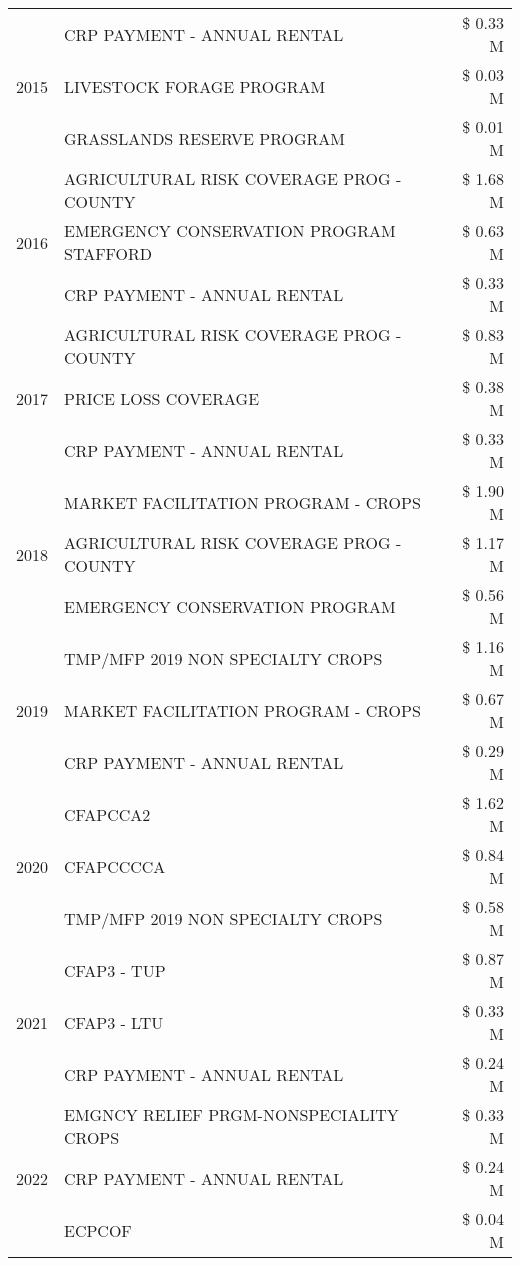 \begin{tabular}{llr}
\cline{1-3}
\multirow[t]{3}{*}{2015} & CRP PAYMENT - ANNUAL RENTAL & \$ 0.33 M \\
 & LIVESTOCK FORAGE PROGRAM & \$ 0.03 M \\
 & GRASSLANDS RESERVE PROGRAM & \$ 0.01 M \\
\cline{1-3}
\multirow[t]{3}{*}{2016} & AGRICULTURAL RISK COVERAGE PROG - COUNTY & \$ 1.68 M \\
 & EMERGENCY CONSERVATION PROGRAM STAFFORD & \$ 0.63 M \\
 & CRP PAYMENT - ANNUAL RENTAL & \$ 0.33 M \\
\cline{1-3}
\multirow[t]{3}{*}{2017} & AGRICULTURAL RISK COVERAGE PROG - COUNTY & \$ 0.83 M \\
 & PRICE LOSS COVERAGE & \$ 0.38 M \\
 & CRP PAYMENT - ANNUAL RENTAL & \$ 0.33 M \\
\cline{1-3}
\multirow[t]{3}{*}{2018} & MARKET FACILITATION PROGRAM - CROPS & \$ 1.90 M \\
 & AGRICULTURAL RISK COVERAGE PROG - COUNTY & \$ 1.17 M \\
 & EMERGENCY CONSERVATION PROGRAM & \$ 0.56 M \\
\cline{1-3}
\multirow[t]{3}{*}{2019} & TMP/MFP 2019 NON SPECIALTY CROPS & \$ 1.16 M \\
 & MARKET FACILITATION PROGRAM - CROPS & \$ 0.67 M \\
 & CRP PAYMENT - ANNUAL RENTAL & \$ 0.29 M \\
\cline{1-3}
\multirow[t]{3}{*}{2020} & CFAPCCA2 & \$ 1.62 M \\
 & CFAPCCCCA & \$ 0.84 M \\
 & TMP/MFP 2019 NON SPECIALTY CROPS & \$ 0.58 M \\
\cline{1-3}
\multirow[t]{3}{*}{2021} & CFAP3 - TUP & \$ 0.87 M \\
 & CFAP3 - LTU & \$ 0.33 M \\
 & CRP PAYMENT - ANNUAL RENTAL & \$ 0.24 M \\
\cline{1-3}
\multirow[t]{3}{*}{2022} & EMGNCY RELIEF PRGM-NONSPECIALITY CROPS & \$ 0.33 M \\
 & CRP PAYMENT - ANNUAL RENTAL & \$ 0.24 M \\
 & ECPCOF & \$ 0.04 M \\
\cline{1-3}
\bottomrule
\end{tabular}

